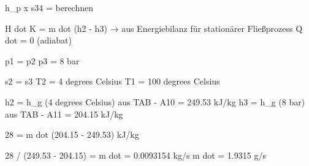 h_p x s34 = berechnen

H dot K = m dot (h2 - h3)  → aus Energiebilanz für stationärer Fließprozess
Q dot = 0 (adiabat)

p1 = p2
p3 = 8 bar

s2 = s3
T2 = 4 degrees Celsius
T1 = 100 degrees Celsius

h2 = h_g (4 degrees Celsius) aus TAB - A10 = 249.53 kJ/kg
h3 = h_g (8 bar) aus TAB - A11 = 204.15 kJ/kg

28 = m dot (204.15 - 249.53) kJ/kg

28 / (249.53 - 204.15) = m dot = 0.0093154 kg/s
m dot = 1.9315 g/s